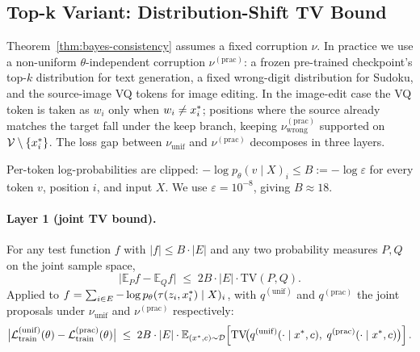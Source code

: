 \subsection{Top-k Variant: Distribution-Shift TV Bound}
\label{app:topk-tv-gap}

Theorem~\ref{thm:bayes-consistency} assumes a fixed corruption $\nu$. In practice we use a non-uniform $\theta$-independent corruption $\nu^{(\mathrm{prac})}$: a frozen pre-trained checkpoint's top-$k$ distribution for text generation, a fixed wrong-digit distribution for Sudoku, and the source-image VQ tokens for image editing. In the image-edit case the VQ token is taken as $w_i$ only when $w_i \neq x^{\ast}_i$; positions where the source already matches the target fall under the keep branch, keeping $\nu^{(\mathrm{prac})}_{\mathrm{wrong}}$ supported on $\mathcal{V} \setminus \{x^{\ast}_i\}$. The loss gap between $\nu_{\mathrm{unif}}$ and $\nu^{(\mathrm{prac})}$ decomposes in three layers.

\begin{assumption}
\label{ass:bounded-rm}
Per-token log-probabilities are clipped: $-\log p_\theta(v \mid X)_i \leq B := -\log\varepsilon$ for every token $v$, position $i$, and input $X$. We use $\varepsilon = 10^{-8}$, giving $B \approx 18$.
\end{assumption}

\paragraph{Layer 1 (joint TV bound).}
For any test function $f$ with $|f| \leq B \cdot |E|$ and any two probability measures $P, Q$ on the joint sample space,
\[
\big|\mathbb{E}_P f - \mathbb{E}_Q f\big| \;\leq\; 2 B \cdot |E| \cdot \mathrm{TV}(P, Q).
\]
Applied to $f = \sum_{i \in E} -\log p_\theta(\tau(z_i, x^{\ast}_i) \mid X)_i$, with $q^{(\mathrm{unif})}$ and $q^{(\mathrm{prac})}$ the joint proposals under $\nu_{\mathrm{unif}}$ and $\nu^{(\mathrm{prac})}$ respectively:
\[
\big|\mathcal{L}_{\mathrm{train}}^{(\mathrm{unif})}(\theta) - \mathcal{L}_{\mathrm{train}}^{(\mathrm{prac})}(\theta)\big| \;\leq\; 2B \cdot |E| \cdot \mathbb{E}_{(x^{\ast}, c) \sim \mathcal{D}}\!\left[\mathrm{TV}\!\big(q^{(\mathrm{unif})}(\cdot \mid x^{\ast}, c),\; q^{(\mathrm{prac})}(\cdot \mid x^{\ast}, c)\big)\right].
\]

